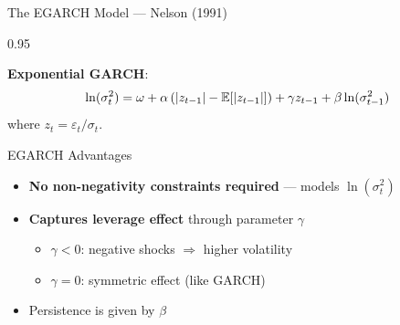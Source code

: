 \documentclass[9pt, aspectratio=169, t]{beamer}
\begin{document}
\begin{frame}{The EGARCH Model --- Nelson (1991)}
    \begin{cminipage}{0.95\textwidth}
    \vspace{-0.3cm}
    {\footnotesize
    \begin{defn}[EGARCH(1,1)]
        \textbf{Exponential GARCH}:
        \[
            \ln(\sigma_t^2) = \omega + \alpha \left( |z_{t-1}| - \mathbb{E}[|z_{t-1}|] \right) + \gamma z_{t-1} + \beta \ln(\sigma_{t-1}^2)
        \]
        where $z_t = \varepsilon_t / \sigma_t$.
    \end{defn}

    \vspace{0.3cm}

    \begin{block}{EGARCH Advantages}
        \begin{itemize}\setlength{\itemsep}{0pt}
            \item \textbf{No non-negativity constraints required} --- models $\ln(\sigma_t^2)$
            \item \textbf{Captures leverage effect} through parameter $\gamma$
            \begin{itemize}\setlength{\itemsep}{0pt}
                \item $\gamma < 0$: negative shocks $\Rightarrow$ higher volatility
                \item $\gamma = 0$: symmetric effect (like GARCH)
            \end{itemize}
            \item Persistence is given by $\beta$
        \end{itemize}
    \end{block}
    }
    \end{cminipage}
\end{frame}
\end{document}
